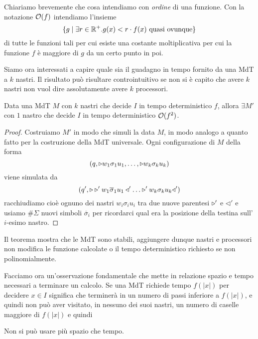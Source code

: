 Chiariamo brevemente che cosa intendiamo con \emph{ordine} di
una funzione. Con la notazione $\mathcal{O}(f)$ intendiamo l'insieme
\[
	\{ g \mid \exists r \in \mathbb{R}^+ . g(x) < r \cdot f(x)
	\text{ quasi ovunque} \}
\]
di tutte le funzioni tali per cui esiste una costante
moltiplicativa per cui la funzione $f$ è maggiore di $g$
da un certo punto in poi.

Siamo ora interessati a capire quale sia il guadagno in tempo
fornito da una MdT a $k$ nastri. Il risultato può risultare
controintuitivo se non si è capito che avere $k$ nastri non
vuol dire assolutamente avere $k$ processori.

\begin{theorem} \label{th: red_nastri}
	Data una MdT $M$ con $k$ nastri che decide $I$ in tempo
	deterministico $f$, allora $\exists M'$ con $1$ nastro che
	decide $I$ in tempo deterministico $\mathcal{O} (f^2)$.
	\begin{proof}
		Costruiamo $M'$ in modo che simuli la data $M$, in modo
		analogo a quanto fatto per la costruzione della MdT
		universale. Ogni configurazione di $M$ della forma
		\[
			(q, \triangleright w_1 \sigma_1 u_1, \dots,
			\triangleright w_k \sigma_k u_k )
		\]
		viene simulata da
		\[
			(q', \start \start' w_1 \overline{\sigma}_1 u_1
			\triangleleft' \dots
			\start' w_k \sigma_k u_k \triangleleft')
		\]
		racchiudiamo cioè ognuno dei nastri $w_i \sigma_i u_i$
		tra due nuove parentesi $\triangleright'$ e $\triangleleft'$ e
		usiamo $\# \Sigma$ nuovi simboli $\overline{\sigma}_i$
		per ricordarci qual era la posizione della testina
		sull'$i$-esimo nastro.

	\end{proof}
\end{theorem}

Il teorema mostra che le MdT sono stabili, aggiungere dunque
nastri e processori non modifica le funzione calcolate o il
tempo deterministico richiesto se non polinomialmente.

Facciamo ora un'osservazione fondamentale che mette in relazione
spazio e tempo necessari a terminare un calcolo. Se una MdT
richiede tempo $f(|x|)$ per decidere $x \in I$ significa che
terminerà in un numero di passi inferiore a $f(|x|)$, e quindi
non può aver visitato, in nessuno dei suoi nastri, un numero di
caselle maggiore di $f(|x|)$ e quindi

\begin{observation}
	Non si può usare più spazio che tempo.
\end{observation}

